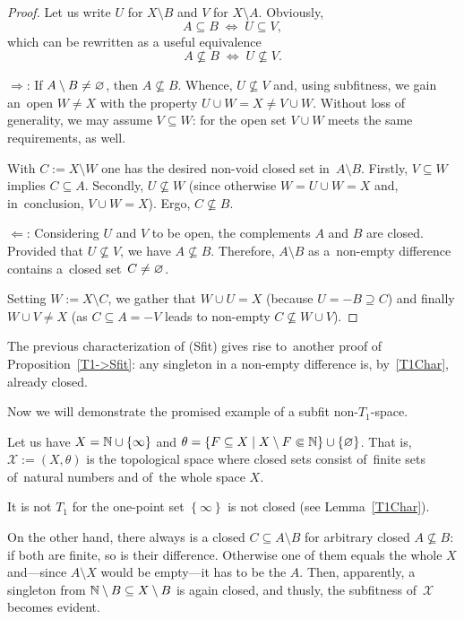 \begin{proof}
  Let us write $U$ for $X\setminus B$ and $V$ for $X\setminus A$.
  Obviously,
  \[
    A\subseteq B \; \Leftrightarrow \; U\subseteq V,
  \]
  which can be rewritten as a useful equivalence
  \[
    A\not\subseteq B \; \Leftrightarrow \; U\not\subseteq V.
  \]

  $\Rightarrow$: If $A\setminus B \ne \varnothing$, then $A\not\subseteq B$.
  Whence, $U\not\subseteq V$ and, using subfitness, we gain an~open $W \ne X$
  with the property $U \cup W = X \ne V \cup W$. 
  Without loss of generality, we may assume $V\subseteq W$: for the open set $V
  \cup W$ meets the same requirements, as well.

  With $C := X \setminus W$ one has the desired non-void closed set
  in~$A\setminus B$.
  Firstly, $V\subseteq W$ implies $C\subseteq A$.
  Secondly, $U\not\subseteq W$ (since otherwise $W = U \cup W = X$ and,
  in~conclusion, $V \cup W = X$).
  Ergo, $C\not\subseteq B$.

  $\Leftarrow$: Considering $U$ and $V$ to be open, the complements $A$ and $B$
  are closed.
  Provided that $U\not\subseteq V$, we have $A\not\subseteq B$.
  Therefore, $A \setminus B$ as a~non-empty difference contains a~closed
  set~$C \ne \varnothing$.

  Setting $W := X \setminus C$, we gather that $W \cup U = X$ (because $U =
  \minus B \supseteq C$) and finally $W \cup V \ne X$ (as $C\subseteq A =
  \minus V$ leads to non-empty $C\not\subseteq W \cup V$).
\end{proof}

\begin{rem}
  The previous characterization of (Sfit) gives rise to~another proof of
  Proposition~\ref{T1->Sfit}\thinspace:
  any singleton in a non-empty difference is, by~\ref{T1Char}\thinspace,
  already closed.
\end{rem}

Now we will demonstrate the promised example of a subfit non-$T_1$-space.

\begin{exmpl}
  Let us have $X = \mathbb{N} \cup \left\{\infty\right\}$ and $\theta = \left\{
  F\subseteq X \mid X\setminus F \Subset \mathbb{N} \right\} \cup \left\{ \varnothing
  \right\}$.
  That is, $\mathcal{X} := (X, \theta)$ is the topological space where closed
  sets consist of~finite sets of~natural numbers and of~the whole space $X$.

  It is not $T_1$ for the one-point set $\left\{ \infty \right\}$ is not
  closed (see Lemma~\ref{T1Char}\thinspace).

  On the other hand, there always is a closed $C \subseteq A\setminus B$ for
  arbitrary closed $A\not\subseteq B$:
  if both are finite, so is their difference.
  Otherwise one of them equals the whole $X$ and---since $A\setminus X$ would
  be empty---it has to be the $A$.
  Then, apparently, a singleton from $\mathbb{N}\setminus B \subseteq X\setminus B$ is
  again closed, and thusly, the subfitness of~$\mathcal{X}$ becomes evident.
\end{exmpl}
